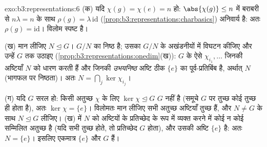 \begin{solution}{exo:b3:representations:6}
(क) यदि $\chi(g) = \chi(e) = n$ हो: $\abs{\chi(g)} \leq n$ में बराबरी से $n\lambda = n$ के साथ $\rho(g) = \lambda\,\mathrm{id}$ (\cref{prop:b3:representations:charbasics})
अनिवार्य है: अतः $\rho(g) = \mathrm{id}$। विलोम स्पष्ट है।

(ख) मान लीजिए $N \trianglelefteq G$। $G/N$ का  निष्ठ है; उसका $G/N$ के अखंडनीयों
में विघटन कीजिए और उन्हें $G$ तक उठाइए (\cref{prop:b3:representations:onedim}(ख)): $G$ के ऐसे
  $\chi_{i_1}, \dots$ जिनकी अष्टियाँ $N$ को धारण करती हैं और जिनकी
\emph{उभयनिष्ठ} अष्टि ठीक $\{e\}$ का पूर्व-प्रतिबिंब है, अर्थात्
$N$ (भागफल पर निष्ठता)। अतः $N = \bigcap_j \ker\chi_{i_j}$।

(ग) यदि $G$ सरल हो: किसी अतुच्छ  $\chi$ के लिए $\ker\chi \trianglelefteq G$ $G$
नहीं है (समूचे $G$ पर तुच्छ कोई  तुच्छ  ही होता
है), अतः $\ker\chi = \{e\}$। विलोमतः मान लीजिए सभी अतुच्छ अष्टियाँ तुच्छ हैं,
और $N \neq
G$ के साथ $N \trianglelefteq G$ लीजिए। (ख) में $N$ को अष्टियों के प्रतिच्छेद
के रूप में व्यक्त करने में कोई न कोई सम्मिलित  अतुच्छ है (यदि
सभी तुच्छ होते, तो प्रतिच्छेद $G$ होता), और उसकी अष्टि $\{e\}$ है:
अतः $N =
\{e\}$। इसलिए एकमात्र  $\{e\}$ और $G$ हैं।
\end{solution}

